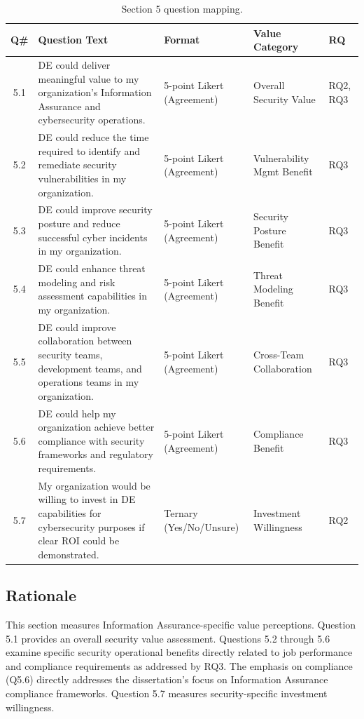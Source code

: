   \begin{table}[H]
    \centering
    \caption{Section 5 question mapping.}
    \label{tab:section5-mapping}
    \small
    \begin{tabular}{@{}cp{2.5in}p{1.0in}p{1.0in}l@{}}
      \toprule
      \textbf{Q\#} & \textbf{Question Text} & \textbf{Format} & \textbf{Value Category} & \textbf{RQ} \\
      \midrule
      5.1 & DE could deliver meaningful value to my organization's Information Assurance and cybersecurity operations. & 5-point Likert (Agreement) & Overall Security Value & RQ2, RQ3 \\
      5.2 & DE could reduce the time required to identify and remediate security vulnerabilities in my organization. & 5-point Likert (Agreement) & Vulnerability Mgmt Benefit & RQ3 \\
      5.3 & DE could improve security posture and reduce successful cyber incidents in my organization. & 5-point Likert (Agreement) & Security Posture Benefit & RQ3 \\
      5.4 & DE could enhance threat modeling and risk assessment capabilities in my organization. & 5-point Likert (Agreement) & Threat Modeling Benefit & RQ3 \\
      5.5 & DE could improve collaboration between security teams, development teams, and operations teams in my organization. & 5-point Likert (Agreement) & Cross-Team Collaboration & RQ3 \\
      5.6 & DE could help my organization achieve better compliance with security frameworks and regulatory requirements. & 5-point Likert (Agreement) & Compliance Benefit & RQ3 \\
      5.7 & My organization would be willing to invest in DE capabilities for cybersecurity purposes if clear ROI could be demonstrated. & Ternary (Yes/No/Unsure) & Investment Willingness & RQ2 \\
      \bottomrule
    \end{tabular}
  \end{table}

  \subsection{Rationale}

  This section measures Information Assurance-specific value perceptions. Question 5.1 provides an overall security value assessment. Questions 5.2 through 5.6 examine specific security operational benefits directly related to job performance and compliance requirements as addressed by RQ3. The emphasis on compliance (Q5.6) directly addresses the dissertation's focus on Information Assurance compliance frameworks. Question 5.7 measures security-specific investment willingness.

